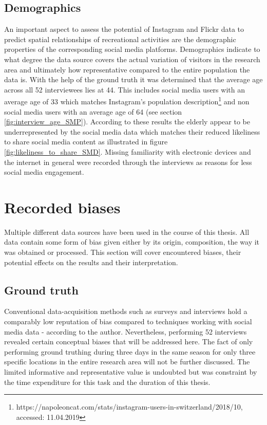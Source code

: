 \subsection{Demographics}
An important aspect to assess the potential of Instagram and Flickr data to predict spatial relationships of recreational activities are the demographic properties of the corresponding social media platforms. Demographics indicate to what degree the data source covers the actual variation of visitors in the research area and ultimately how representative compared to the entire population the data is. With the help of the ground truth it was determined that the average age across all 52 interviewees lies at 44. This includes social media users with an average age of 33 which matches Instagram's population description\footnote{https://napoleoncat.com/stats/instagram-users-in-switzerland/2018/10, accessed: 11.04.2019} and non social media users with an average age of 64 (see section \ref{fig:interview_age_SMP}). According to these results the elderly appear to be underrepresented by the social media data which matches their reduced likeliness to share social media content as illustrated in figure \ref{fig:likeliness_to_share_SMD}. Missing familiarity with electronic devices and the internet in general were recorded through the interviews as reasons for less social media engagement. 

\section{Recorded biases} \label{discussion_rec_bias}
Multiple different data sources have been used in the course of this thesis. All data contain some form of bias given either by its origin, composition, the way it was obtained or processed. This section will cover encountered biases, their potential effects on the results and their interpretation.

\subsection{Ground truth} \label{discussion_bias_ground_truth}
Conventional data-acquisition methods such as surveys and interviews hold a comparably low reputation of bias compared to techniques working with social media data - according to the author. Nevertheless, performing 52 interviews revealed certain conceptual biases that will be addressed here. The fact of only performing ground truthing during three days in the same season for only three specific locations in the entire research area will not be further discussed. The limited informative and representative value is undoubted but was constraint by the time expenditure for this task and the duration of this thesis. \\

